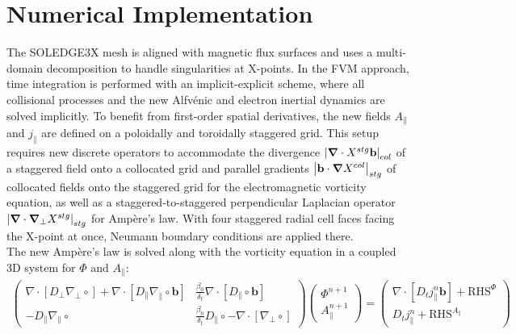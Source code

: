 \chapter{Numerical Implementation}
\label{chap:Implementation}
\begin{chaptersummarybox}
	The SOLEDGE3X mesh is aligned with magnetic flux surfaces and uses a multi-domain decomposition to handle singularities at X-points. In the FVM approach, time integration is performed with an implicit-explicit scheme, where all collisional processes and the new Alfvénic and electron inertial dynamics are solved implicitly. To benefit from first-order spatial derivatives, the new fields $A_\parallel$ and $j_\parallel$ are defined on a poloidally and toroidally staggered grid. This setup requires new discrete operators to accommodate the divergence $\left|\grad\cdot X^{stg}\textbf{b}\right|_{col}$ of a staggered field onto a collocated grid and parallel gradients $\left|\textbf{b}\cdot\grad X^{col}\right|_{stg}$ of collocated fields onto the staggered grid for the electromagnetic vorticity equation, as well as a staggered-to-staggered perpendicular Laplacian operator $\left|\grad\cdot\grad_\perp X^{stg}\right|_{stg}$ for Ampère's law. With four staggered radial cell faces facing the X-point at once, Neumann boundary conditions are applied there. \\	
	The new Ampère's law is solved along with the vorticity equation in a coupled 3D system for $\Phi$ and $A_\parallel$:	
	\begin{align*}
		\begin{pmatrix}
			\nabla \cdot \left[ D_\perp \nabla_\perp \circ \right] + \nabla \cdot \left[ D_\parallel \nabla_\parallel \circ \mathbf{b} \right]  
			& \frac{\beta_0}{\delta_t} \nabla \cdot \left[ D_\parallel \circ \mathbf{b} \right] \\
			-D_\parallel \nabla_\parallel \circ &
			\frac{\beta_0}{\delta_t} D_\parallel \circ - \nabla \cdot \left[ \nabla_\perp \circ \right]
		\end{pmatrix}
		\begin{pmatrix}
			\Phi^{n+1} \\ A_\parallel^{n+1}
		\end{pmatrix} 
		= 
		\begin{pmatrix}
			\nabla \cdot \left[ D_t j^{n}_\parallel \mathbf{b} \right] + \text{RHS}^\Phi \\
			D_t j^{n}_\parallel + \text{RHS}^{A_\parallel}
		\end{pmatrix}& \\

\end{align*}
\end{chaptersummarybox}
